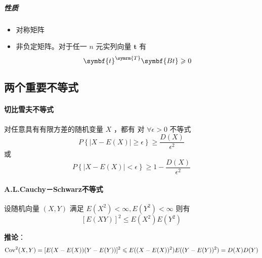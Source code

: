 \subparagraph{性质} 
\begin{itemize}[leftmargin=\subparitemindent]
    \item 对称矩阵
    \item 非负定矩阵。对于任一 $ n $ 元实列向量 $ \symbf{t} $ 有
    $$ \symbf{t}^{\symrm{T}} \symbf{Bt} \geqslant 0 $$
\end{itemize}

\subsection{两个重要不等式}

\paragraph{切比雪夫不等式} 对任意具有有限方差的随机变量 $ X $ ，都有
对 $ \forall \epsilon > 0 $ 不等式
\begin{equation}
    P\left\{ \left| X - E(X) \right| \geqslant \epsilon \right\} \geqslant \frac{D(X)}{\epsilon^2}
\end{equation}
或
\begin{equation}
    P\left\{ \left| X - E(X) \right| < \epsilon \right\} \geqslant 1 - \frac{D(X)}{\epsilon^2}
\end{equation}

\paragraph{A.L.Cauchy－Schwarz不等式} 设随机向量 $ (X,Y) $ 满足 $ E(X^2) < \infty, E(Y^2) < \infty $
则有 $$ \left[ E(XY) \right]^2 \leqslant E(X^2)E(Y^2) $$

\textbf{推论}：
$$ \mathrm{Cov}^2(X,Y) = [E(X - E(X))(Y - E(Y))]^2 \leqslant E((X - E(X))^2)E((Y - E(Y))^2) = D(X)D(Y) $$